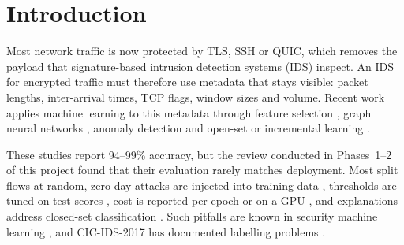 \documentclass[pdflatex,sn-mathphys-num,iicol]{sn-jnl}%
\begin{document}
\section{Introduction}\label{sec:intro}

Most network traffic is now protected by TLS, SSH or QUIC, which removes the payload that signature-based intrusion detection systems (IDS) inspect. An IDS for encrypted traffic must therefore use metadata that stays visible: packet lengths, inter-arrival times, TCP flags, window sizes and volume. Recent work applies machine learning to this metadata through feature selection \cite{lee2026afs,xu2025pathsig}, graph neural networks \cite{liu2026fireg,li2026mtdecipher,yuan2025dcgl,liu2025gcnmha,okonkwo2025graph}, anomaly detection \cite{sattar2025etssl,haynes2025evade} and open-set or incremental learning \cite{yang2026ohce,cevallos2025hero,carillo2025fcil}.

These studies report 94--99\% accuracy, but the review conducted in Phases~1--2 of this project found that their evaluation rarely matches deployment. Most split flows at random, zero-day attacks are injected into training data \cite{sattar2025etssl}, thresholds are tuned on test scores \cite{haynes2025evade}, cost is reported per epoch \cite{yuan2025dcgl} or on a GPU \cite{yang2026ohce}, and explanations address closed-set classification \cite{xu2025pathsig,carillo2025fcil}. Such pitfalls are known in security machine learning \cite{arp2022dos}, and CIC-IDS-2017 has documented labelling problems \cite{engelen2021troubleshooting}.
\end{document}
